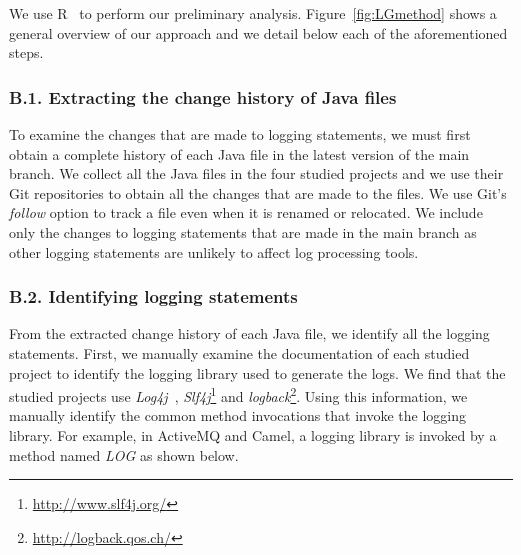 We use R~\cite{ihaka1996r} to perform our preliminary analysis. Figure~\ref{fig:LGmethod} shows a general overview of our approach and we detail below each of the aforementioned steps. 

\subsubsection*{B.1. Extracting the change history of Java files} 
To examine the changes that are made to logging statements, we must first obtain a complete history of each Java file in the latest version of the main branch.
We collect all the Java files in the four studied projects and we use their Git repositories to obtain all the changes that are made to the files. We use Git's \emph{follow} option to track a file even when it is renamed or relocated. We include only the changes to logging statements that are made in the main branch as other logging statements are unlikely to affect log processing tools. %

\subsubsection*{B.2. Identifying logging statements}
From the extracted change history of each Java file, we identify all the logging statements.
First, we manually examine the documentation of each studied project to identify the logging library used to generate the logs. %
We find that the studied projects use \textsl{Log4j}~\cite{EMSEIAN}, \emph{Slf4j}\footnote{\url{http://www.slf4j.org/}} and \emph{logback}\footnote{\url{http://logback.qos.ch/}}.
Using this information, we manually identify the common method invocations that invoke the logging library. For example, in ActiveMQ and Camel, a logging library is invoked by a method named \emph{LOG} as shown below.


